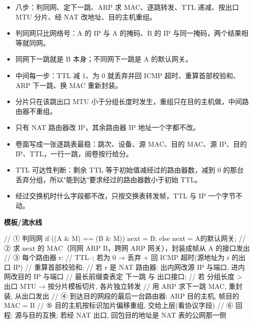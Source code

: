 \documentclass[10pt,a4paper]{ctexart}
\begin{document}
\begin{itemize}

\item 八步：判同网、定下一跳、ARP 求 MAC、逐跳转发、TTL 递减、按出口 MTU 分片、经 NAT 改地址、目的主机重组。

\item 判同网只比网络号：A 的 IP 与 A 的掩码、B 的 IP 与同一掩码，两个结果相等就同网。

\item 同网下一跳就是 B 本身；不同网下一跳是 A 的默认网关。

\item 中间每一步：TTL 减 1、为 0 就丢弃并回 ICMP 超时、重算首部校验和、ARP 下一跳、换 MAC 重新封装。

\item 分片只在该跳出口 MTU 小于分组长度时发生，重组只在目的主机做，中间路由器不重组。

\item 只有 NAT 路由器改 IP，其余路由器 IP 地址一个字都不改。

\item 卷面写成一张逐跳表最稳：跳次、设备、源 MAC、目的 MAC、源 IP、目的 IP、TTL，一行一跳，阅卷按行给分。

\item TTL 可达性判断：剩余 TTL 等于初始值减经过的路由器数，减到 0 的那台丢弃分组，所以"能到达"要求经过的路由器数小于初始 TTL。

\item 经过交换机时什么字段都不改，只按交换表转发帧，TTL 与 IP 一个字节不动。

\end{itemize}

\textbf{模板/流水线}

\begin{codebox}
// ① 判同网
if ((A & M) == (B & M)) next = B; else next = A的默认网关;
// ② 求 next 的 MAC（同网 ARP B，跨网 ARP 网关），封装成帧从 A 的接口发出
// ③ 每个路由器 r:
//    TTL--; 若为 0 → 丢弃 + 回 ICMP 超时(源地址为 r 的出口 IP)
//    重算首部校验和;
//    若 r 是 NAT 路由器: 出内网改源 IP 与端口, 进内网改目的 IP 与端口
//    最长前缀查表定 下一跳 与 出口接口;
//    若 分组长度 > 出口 MTU → 按分片模板切片, 各片独立转发
//    用 ARP 求下一跳 MAC, 重封装, 从出口发出
// ④ 到达目的网段的最后一台路由器: ARP 目的主机, 帧目的 MAC = B
// ⑤ 目的主机按标识加片偏移重组, 交给上层(看协议字段)
// ⑥ 回程: 源与目的互换; 若经 NAT 出口, 回包目的地址是 NAT 表的公网那一侧
\end{codebox}
\end{document}
